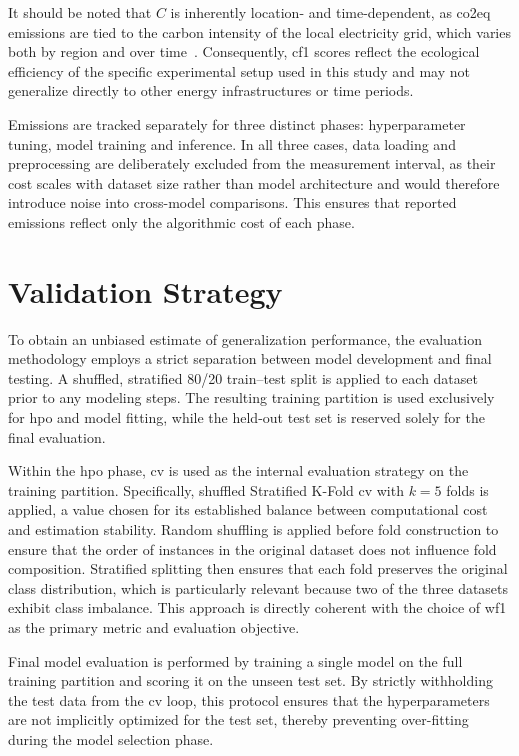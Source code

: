 It should be noted that $C$ is inherently location- and time-dependent, as \gls{co2eq} emissions are tied to the carbon intensity of the local electricity grid, which varies both by region and over time~\cite{wrightEfficiencyNotEnough2025}. Consequently, \gls{cf1} scores reflect the ecological efficiency of the specific experimental setup used in this study and may not generalize directly to other energy infrastructures or time periods.

Emissions are tracked separately for three distinct phases: hyperparameter tuning, model training and inference. In all three cases, data loading and preprocessing are deliberately excluded from the measurement interval, as their cost scales with dataset size rather than model architecture and would therefore introduce noise into cross-model comparisons. This ensures that reported emissions reflect only the algorithmic cost of each phase.

\section{Validation Strategy}
\label{design_validation}

To obtain an unbiased estimate of generalization performance, the evaluation methodology employs a strict separation between model development and final testing. A shuffled, stratified 80/20 train--test split is applied to each dataset prior to any modeling steps. The resulting training partition is used exclusively for \gls{hpo} and model fitting, while the held-out test set is reserved solely for the final evaluation.

Within the \gls{hpo} phase, \gls{cv} is used as the internal evaluation strategy on the training partition. Specifically, shuffled Stratified K-Fold \gls{cv} with $k=5$ folds is applied, a value chosen for its established balance between computational cost and estimation stability. Random shuffling is applied before fold construction to ensure that the order of instances in the original dataset does not influence fold composition. Stratified splitting then ensures that each fold preserves the original class distribution, which is particularly relevant because two of the three datasets exhibit class imbalance. This approach is directly coherent with the choice of \gls{wf1} as the primary metric and evaluation objective.

Final model evaluation is performed by training a single model on the full training partition and scoring it on the unseen test set. By strictly withholding the test data from the \gls{cv} loop, this protocol ensures that the hyperparameters are not implicitly optimized for the test set, thereby preventing over-fitting during the model selection phase.

